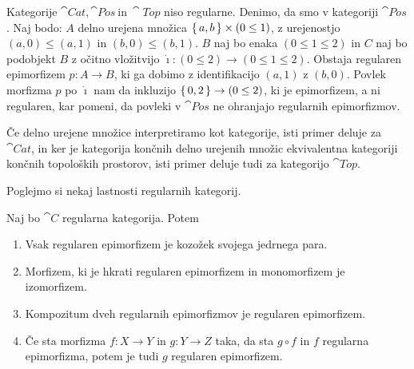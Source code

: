 \documentclass[../kategoricna_logika.tex]{subfiles}
\begin{document}
\begin{primer}
  Kategorije $\cat{Cat}, \cat{Pos}\ \text{in}\ \cat{Top}$ niso
  regularne. Denimo, da smo v kategoriji $\cat{Pos}$.
  Naj bodo: $A$ delno urejena množica $\lbrace\,a, b\,\rbrace \times (0 \leq 1)$,
  z urejenostjo $(a,0) \leq (a,1)$ in $(b,0) \leq (b,1)$.
  $B$ naj bo enaka $(0 \leq 1 \leq 2)$ in $C$ naj bo podobjekt $B$
  z očitno vložitvijo ${\dot{\imath}} : (0 \leq 2) \to (0 \leq 1 \leq 2)$.
  Obstaja regularen epimorfizem ${p : A \to B}$, ki ga
  dobimo z identifikacijo $(a,1)$ z $(b, 0)$. Povlek morfizma $p$ po
  $\dot{\imath}$ nam da inkluzijo $\lbrace\,0, 2\,\rbrace \to (0 \leq 2)$, ki je
  epimorfizem, a ni regularen, kar pomeni, da povleki v $\cat{Pos}$ ne
  ohranjajo regularnih epimorfizmov.

  Če delno urejene množice interpretiramo kot kategorije, isti primer
  deluje za $\cat{Cat}$, in ker je kategorija končnih delno urejenih
  množic ekvivalentna kategoriji končnih topoloških prostorov, isti
  primer deluje tudi za kategorijo $\cat{Top}$.
\end{primer}
Poglejmo si nekaj lastnosti regularnih kategorij.
\begin{lema}\label{lema:lastnosti-regularnih-epimorfizmov}
  Naj bo $\cat{C}$ regularna kategorija. Potem
  \begin{enumerate}[label=(\roman*), nosep]
  \item Vsak regularen epimorfizem je kozožek svojega jedrnega para.
  \item Morfizem, ki je hkrati regularen epimorfizem in monomorfizem
    je izo\-morfizem.
  \item Kompozitum dveh regularnih epimorfizmov je regularen
    epimorfizem.
  \item Če sta morfizma $f : X \to Y$ in $g : Y \to Z$ taka, da sta
    $g \circ f$ in $f$ regularna epimorfizma, potem je tudi $g$
    regularen epimorfizem.
  \end{enumerate}
\end{lema}
\end{document}
